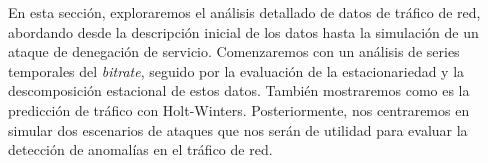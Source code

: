 En esta sección, exploraremos el análisis detallado de datos de tráfico de red, abordando desde la descripción inicial de los datos hasta la simulación de un ataque de denegación de servicio. Comenzaremos con un análisis de series temporales del \textit{bitrate}, seguido por la evaluación de la estacionariedad y la descomposición estacional de estos datos. También mostraremos como es la predicción de tráfico con Holt-Winters.
Posteriormente, nos centraremos en simular dos escenarios de ataques que nos serán de utilidad para evaluar la detección de anomalías en el tráfico de red.